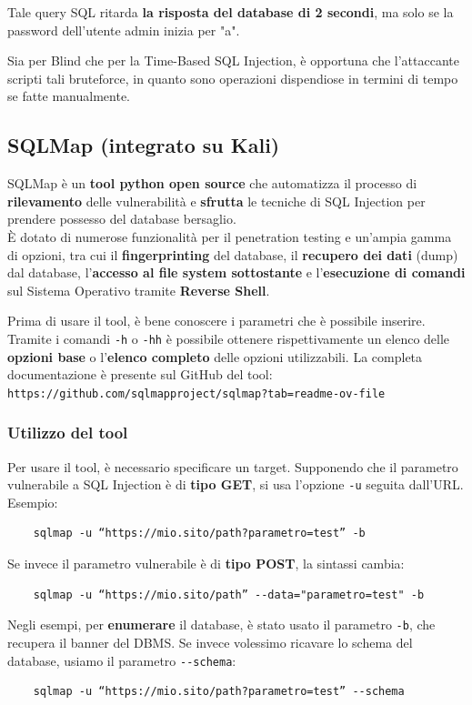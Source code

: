 \documentclass{article}
\begin{document}
Tale query SQL ritarda \textbf{la risposta del database di 2 secondi}, ma solo se la password dell’utente admin inizia per "a".

Sia per Blind che per la Time-Based SQL Injection, è opportuna che l'attaccante scripti tali bruteforce, in quanto sono operazioni dispendiose in termini di tempo se fatte manualmente.

\subsection{SQLMap (integrato su Kali)}
SQLMap è un \textbf{tool python open source} che automatizza il processo di \textbf{rilevamento} delle vulnerabilità e \textbf{sfrutta} le tecniche di SQL Injection per prendere possesso del database bersaglio. \\
È dotato di numerose funzionalità per il penetration testing e un'ampia gamma di opzioni, tra cui il \textbf{fingerprinting} del database, il \textbf{recupero dei dati} (dump) dal database, l'\textbf{accesso al file system sottostante} e l'\textbf{esecuzione di comandi} sul Sistema Operativo tramite \textbf{Reverse Shell}.

Prima di usare il tool, è bene conoscere i parametri che è possibile inserire. Tramite i comandi \verb|-h| o \verb|-hh| è possibile ottenere rispettivamente un elenco delle \textbf{opzioni base} o l'\textbf{elenco completo} delle opzioni utilizzabili. La completa documentazione è presente sul GitHub del tool:\\
\verb|https://github.com/sqlmapproject/sqlmap?tab=readme-ov-file| 

\subsubsection{Utilizzo del tool}
Per usare il tool, è necessario specificare un target. Supponendo che il parametro vulnerabile a SQL Injection è di \textbf{tipo GET}, si usa l'opzione \verb|-u| seguita dall'URL. Esempio:
\begin{verbatim}
	sqlmap -u “https://mio.sito/path?parametro=test” -b
\end{verbatim}

Se invece il parametro vulnerabile è di \textbf{tipo POST}, la sintassi cambia:
\begin{verbatim}
	sqlmap -u “https://mio.sito/path” --data="parametro=test" -b
\end{verbatim}

Negli esempi, per \textbf{enumerare} il database, è stato usato il parametro \verb|-b|, che recupera il banner del DBMS. Se invece volessimo ricavare lo schema del database, usiamo il parametro \verb|--schema|:
\begin{verbatim}
	sqlmap -u “https://mio.sito/path?parametro=test” --schema
\end{verbatim}
\end{document}
